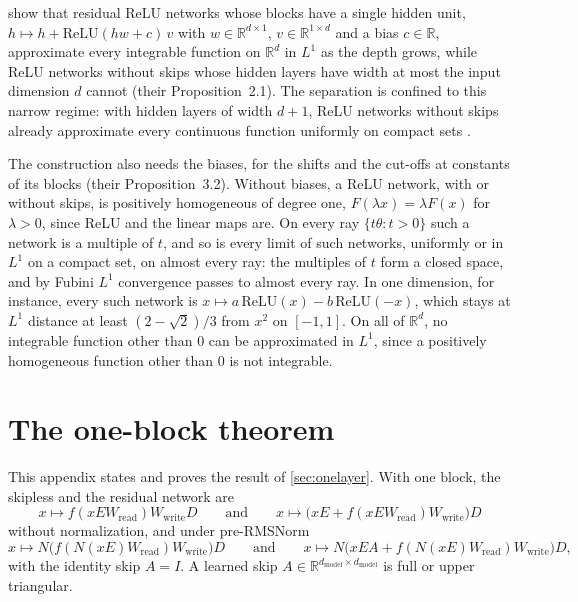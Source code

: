 \documentclass[10pt]{article}
\theoremstyle{definition}
\theoremstyle{remark}
\newcommand{\R}{\mathbb{R}}
\newcommand{\Wread}{W_{\mathrm{read}}}
\newcommand{\Wwrite}{W_{\mathrm{write}}}
\newcommand{\dm}{d_{\mathrm{model}}}
\begin{document}
\citet{lin2018resnet} show that residual ReLU networks whose blocks have a single hidden unit, $h \mapsto h + \mathrm{ReLU}(hw + c)\,v$ with $w \in \R^{d\times 1}$, $v \in \R^{1\times d}$ and a bias $c \in \R$, approximate every integrable function on $\R^d$ in $L^1$ as the depth grows, while ReLU networks without skips whose hidden layers have width at most the input dimension $d$ cannot (their Proposition~2.1). The separation is confined to this narrow regime: with hidden layers of width $d + 1$, ReLU networks without skips already approximate every continuous function uniformly on compact sets \citep{hanin2017approximating}.

The construction also needs the biases, for the shifts and the cut-offs at constants of its blocks (their Proposition~3.2). Without biases, a ReLU network, with or without skips, is positively homogeneous of degree one, $F(\lambda x) = \lambda F(x)$ for $\lambda > 0$, since ReLU and the linear maps are. On every ray $\{t\theta : t > 0\}$ such a network is a multiple of $t$, and so is every limit of such networks, uniformly or in $L^1$ on a compact set, on almost every ray: the multiples of $t$ form a closed space, and by Fubini $L^1$ convergence passes to almost every ray. In one dimension, for instance, every such network is $x \mapsto a\,\mathrm{ReLU}(x) - b\,\mathrm{ReLU}(-x)$, which stays at $L^1$ distance at least $(2 - \sqrt2)/3$ from $x^2$ on $[-1, 1]$. On all of $\R^d$, no integrable function other than $0$ can be approximated in $L^1$, since a positively homogeneous function other than $0$ is not integrable.

\section{The one-block theorem}\label{app:onelayer}

This appendix states and proves the result of \cref{sec:onelayer}. With one block, the skipless and the residual network are
\[
x \mapsto f(xE\Wread)\Wwrite D \qquad\text{and}\qquad x \mapsto \big(xE + f(xE\Wread)\Wwrite\big)D
\]
without normalization, and under pre-RMSNorm
\[
x \mapsto N\big(f(N(xE)\Wread)\Wwrite\big)D \qquad\text{and}\qquad x \mapsto N\big(xEA + f(N(xE)\Wread)\Wwrite\big)D,
\]
with the identity skip $A = I$. A learned skip $A \in \R^{\dm\times\dm}$ is full or upper triangular.
\end{document}
